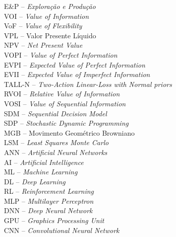 \noindent \doublespacing
E\&P -- \textit{Exploração e Produção}\\
VOI -- \textit{Value of Information}\\
VoF -- \textit{Value of Flexibility}\\
VPL -- Valor Presente Líquido\\
NPV -- \textit{Net Present Value}\\
VOPI -- \textit{Value of Perfect Information}\\
EVPI -- \textit{Expected Value of Perfect Information}\\
EVII -- \textit{Expected Value of Imperfect Information}\\
TALL-N -- \textit{Two-Action Linear-Loss with Normal priors}\\
RVOI -- \textit{Relative Value of Information}\\
VOSI -- \textit{Value of Sequential Information}\\
SDM -- \textit{Sequential Decision Model}\\
SDP -- \textit{Stochastic Dynamic Programming}\\
MGB -- Movimento Geométrico Browniano\\
LSM -- \textit{Least Squares Monte Carlo}\\
ANN -- \textit{Artificial Neural Networks}\\
AI -- \textit{Artificial Intelligence}\\
ML -- \textit{Machine Learning}\\
DL -- \textit{Deep Learning}\\
RL -- \textit{Reinforcement Learning}\\
MLP -- \textit{Multilayer Perceptron}\\
DNN -- \textit{Deep Neural Network}\\
GPU -- \textit{Graphics Processing Unit}\\
CNN -- \textit{Convolutional Neural Network}\\

